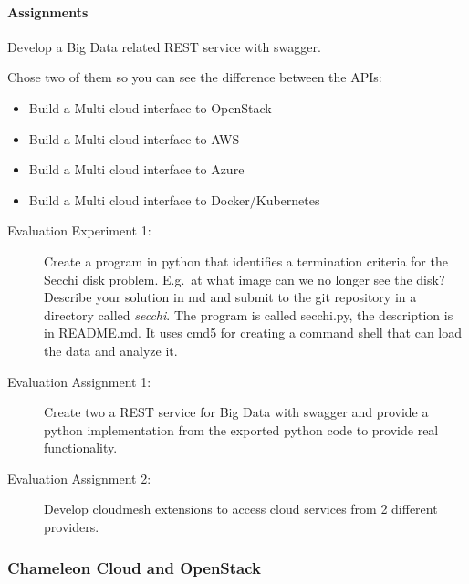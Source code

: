 

\paragraph{Assignments}

Develop a Big Data related REST service with swagger.

Chose two of them so you can see the difference between the APIs:

\begin{itemize}
\item Build a Multi cloud interface to OpenStack
\item Build a Multi cloud interface to AWS
\item Build a Multi cloud interface to Azure
\item Build a Multi cloud interface to Docker/Kubernetes
\end{itemize}


\begin{description}
\item[Evaluation Experiment 1:] Create a program in python that
  identifies a termination criteria for the Secchi disk
  problem. E.g.\ at what image can we no longer see the disk?
  Describe your solution in md and submit to the git repository in a
  directory called \textit{secchi}. The program is called secchi.py, the
  description is in README.md. It uses cmd5 for creating a command
  shell that can load the data and analyze it. 
\item[Evaluation Assignment 1:] Create two a REST service for Big Data
  with swagger and provide a python implementation from the exported
  python code to provide real functionality.
\item[Evaluation Assignment 2:] Develop cloudmesh extensions to access
  cloud services from 2 different providers.
\end{description}

\subsubsection{Chameleon Cloud and OpenStack}



